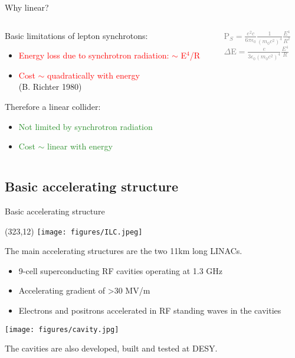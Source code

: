 \documentclass[xcolor={dvipsnames}]{beamer}
\newcommand{\ilclogo}{
  \setlength{\TPHorizModule}{1pt}
  \setlength{\TPVertModule}{1pt}
  \begin{textblock}{1}(323,12)
   \texttt{[image: figures/ILC.jpeg]}
  \end{textblock}
}
\begin{document}
\begin{frame}{Why linear?}
\begin{columns}
 \begin{column}{0.6\textwidth}
  Basic limitations of lepton synchrotons:
\begin{itemize}
 \item \textcolor{Red}{Energy loss due to synchrotron radiation: $\sim$ E$^4$/R}
 \item \textcolor{Red}{Cost $\sim$ quadratically with energy}\\ \tiny{(B. Richter 
1980)}
\end{itemize}
\vspace*{1cm}
Therefore a linear collider:
\begin{itemize}
 \item \textcolor{ForestGreen}{Not limited by synchrotron radiation}
 \item \textcolor{ForestGreen}{Cost $\sim$ linear with energy}
\end{itemize}
 \end{column}
 \begin{column}{0.4\textwidth}
 \begin{block}{}
  \begin{center}
      \textcolor{Gray}{P$_S=\frac{e^2c}{6\pi\epsilon_0}\frac{1}{(m_0c^2)^4}\frac{E^4}{R^2}$\\
  $\Delta$E$=\frac{e}{3\epsilon_0(m_0c^2)^4}\frac{E^4}{R}$}
   \end{center}
 \end{block}
 \end{column}
\end{columns}

\end{frame}

\subsection{Basic accelerating structure}
\begin{frame}{Basic accelerating structure}
\ilclogo
The main accelerating structures are the two 11km long LINACs.
\begin{itemize}
\item 9-cell superconducting RF cavities operating at 1.3 GHz 
\item Accelerating gradient of >30 MV/m
\item Electrons and positrons accelerated in RF standing waves in the cavities 
\end{itemize}
\begin{center}
\texttt{[image: figures/cavity.jpg]}
\end{center}
The cavities are also developed, built and tested at DESY.
\end{frame}
\end{document}

